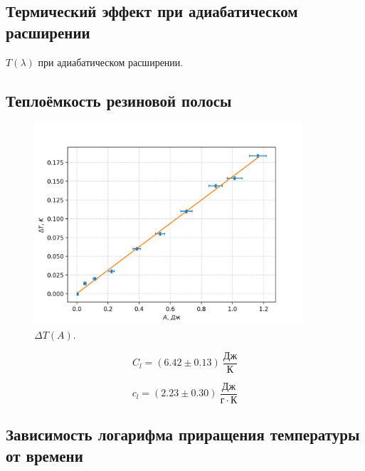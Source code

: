 \documentclass[a4paper,12pt]{article} %
\begin{document}
\FloatBarrier

\subsection*{Термический эффект при адиабатическом расширении}

\begin{table}[h!]

\caption{$T(\lambda)$ при адиабатическом расширении.}
\end{table}

\subsection*{Теплоёмкость резиновой полосы}

\begin{figure}[h!]
\begin{center}
\includegraphics[width=0.89\textwidth]{T(A).png}
\caption{$\Delta T(A)$.}\label{TA}
\end{center}
\end{figure}

\begin{equation}\label{c1}
    C_l = (6.42 \pm 0.13) \ \frac{Дж}{К}
\end{equation}

\begin{equation}\label{c2}
    c_l = (2.23 \pm 0.30) \ \frac{Дж}{г \cdot К}
\end{equation}

\FloatBarrier

\subsection*{Зависимость логарифма приращения температуры от времени}
\end{document}

